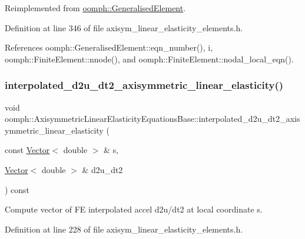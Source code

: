 Reimplemented from \hyperlink{classoomph_1_1GeneralisedElement_a069f59bfc3e607a5bebba52c6314d777}{oomph\+::\+Generalised\+Element}.



Definition at line 346 of file axisym\+\_\+linear\+\_\+elasticity\+\_\+elements.\+h.



References oomph\+::\+Generalised\+Element\+::eqn\+\_\+number(), i, oomph\+::\+Finite\+Element\+::nnode(), and oomph\+::\+Finite\+Element\+::nodal\+\_\+local\+\_\+eqn().

\mbox{\label{classoomph_1_1AxisymmetricLinearElasticityEquationsBase_a5fd012d570d52057193e0799a3150f20}} 
\subsubsection{\texorpdfstring{interpolated\+\_\+d2u\+\_\+dt2\+\_\+axisymmetric\+\_\+linear\+\_\+elasticity()}{interpolated\_d2u\_dt2\_axisymmetric\_linear\_elasticity()}}
{\footnotesize\ttfamily void oomph\+::\+Axisymmetric\+Linear\+Elasticity\+Equations\+Base\+::interpolated\+\_\+d2u\+\_\+dt2\+\_\+axisymmetric\+\_\+linear\+\_\+elasticity (\begin{DoxyParamCaption}\item[{const \hyperlink{classoomph_1_1Vector}{Vector}$<$ double $>$ \&}]{s,  }\item[{\hyperlink{classoomph_1_1Vector}{Vector}$<$ double $>$ \&}]{d2u\+\_\+dt2 }\end{DoxyParamCaption}) const\hspace{0.3cm}{\ttfamily [inline]}}



Compute vector of FE interpolated accel d2u/dt2 at local coordinate s. 



Definition at line 228 of file axisym\+\_\+linear\+\_\+elasticity\+\_\+elements.\+h.



